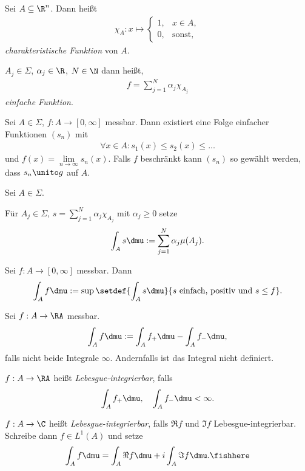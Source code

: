 \begin{defn}
\label{defn:7.11}
\begin{defnenum}
\item Sei $A\subseteq \R^n$. Dann heißt
\begin{align*}
\chi_A : x\mapsto
\begin{cases}
1, & x\in A,\\
0, & \text{sonst},
\end{cases}
\end{align*}
\emph{charakteristische Funktion} von $A$.
\item $A_j\in\Sigma$, $\alpha_j\in\R $, $N\in\N$ dann heißt,
\begin{align*}
f = \sum_{j=1}^N \alpha_j \chi_{A_j}
\end{align*} 
\emph{einfache Funktion}.\fishhere
\end{defnenum}
\end{defn}

\begin{prop}
\label{prop:7.12}
Sei $A\in\Sigma$, $f: A\to[0,\infty]$ messbar. Dann existiert eine Folge
einfacher Funktionen $(s_n)$ mit
\begin{align*}
\forall x\in A : s_1(x)\le s_2(x)\le \ldots
\end{align*}
und $f(x) = \lim\limits_{n\to\infty} s_n(x)$. Falls $f$ beschränkt kann $(s_n)$
so gewählt werden, dass $s_n\unito g$ auf $A$.\fishhere
\end{prop}

\begin{prop}
\label{prop:7.13}
Sei $A\in\Sigma$.
\begin{propenum}
\item Für $A_j\in\Sigma$, $s=\sum_{j=1}^N \alpha_j \chi_{A_j}$ mit $\alpha_j\ge
0$ setze
\begin{align*}
\int_A s \dmu := \sum_{j=1}^N \alpha_j \mu(A_j).
\end{align*}
\item Sei $f: A\to [0,\infty]$ messbar. Dann
\begin{align*}
\int_A f \dmu := \sup
\setdef{\int_A s \dmu}{s\text{ einfach, positiv und }s\le f}.
\end{align*}
\item Sei $f: A\to\RA$ messbar.
\begin{align*}
\int_A f\dmu := \int_A f_+ \dmu - \int_A f_-\dmu,
\end{align*}
falls nicht beide Integrale $\infty$. Andernfalls ist das Integral nicht
definiert.
\item $f: A\to\RA$ heißt \emph{Lebesgue-integrierbar}, falls
\begin{align*}
\int_A f_+\dmu,\quad \int_A f_-\dmu < \infty.
\end{align*}
\item $f: A\to \C$ heißt \emph{Lebesgue-integrierbar}, falls $\Re f$ und $\Im
f$ Lebesgue-integrierbar. Schreibe dann $f\in L^1(A)$ und setze
\begin{align*}
\int_A f\dmu = \int_A \Re f \dmu + i\int_A \Im f\dmu.\fishhere
\end{align*}
\end{propenum}
\end{prop}

